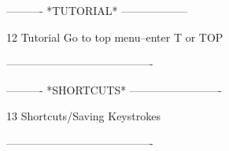  
 
 
 
 
 
 
 
 
 
 
 
 
 
 
 
 
 
 
 
 
 
 
 
 
 
 
 
 
 
 
 
 
 
 
 
 
 
 
 
 
 
 
 
 
 
 
 
 
 
 
 
 
 
 
 
 
 
 
 
 
 
 
 
 
 
 
 
 
 
 
 
 
 
 
 
 
 
 
 
 
 
 
 
 
 
 
 
 
 
 
 
 
 
 
----------  *TUTORIAL*  ------------------
 
12
Tutorial
   Go to top menu--enter T or TOP
 
----------------------------------------
 
----------  *SHORTCUTS*  -------------------------
 
13
Shortcuts/Saving Keystrokes
 
----------------------------------------
 
 
 
